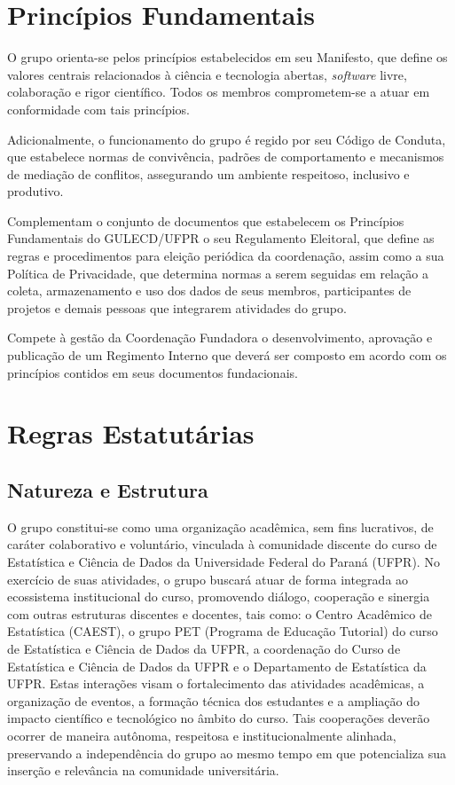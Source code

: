 \documentclass[
  12pt,          %
  a4paper,       %
  oneside,       %
  brazil         %
]{article}
\begin{document}
\section{Princípios Fundamentais}

O grupo orienta-se pelos princípios estabelecidos em seu Manifesto, que define os valores centrais relacionados à ciência e tecnologia abertas, \textit{software} livre, 
colaboração e rigor científico. Todos os membros comprometem-se a atuar em conformidade com tais princípios.

Adicionalmente, o funcionamento do grupo é regido por seu Código de Conduta, que estabelece normas de convivência, padrões de comportamento e 
mecanismos de mediação de conflitos, assegurando um ambiente respeitoso, inclusivo e produtivo.

Complementam o conjunto de documentos que estabelecem os Princípios Fundamentais do GULECD/UFPR o seu Regulamento Eleitoral, que define as regras e procedimentos para eleição 
periódica da coordenação, assim como a sua Política de Privacidade, que determina normas a serem seguidas em relação a coleta, armazenamento e uso dos dados de seus membros, 
participantes de projetos e demais pessoas que integrarem atividades do grupo.

Compete à gestão da Coordenação Fundadora o desenvolvimento, aprovação e publicação de um Regimento Interno que deverá ser composto em acordo com os princípios contidos 
em seus documentos fundacionais.

\section{Regras Estatutárias}

\subsection{Natureza e Estrutura}

O grupo constitui-se como uma organização acadêmica, sem fins lucrativos, de caráter colaborativo e voluntário, vinculada à comunidade 
discente do curso de Estatística e Ciência de Dados da Universidade Federal do Paraná (UFPR). 
No exercício de suas atividades, o grupo buscará atuar de forma integrada ao ecossistema institucional do curso, promovendo diálogo, 
cooperação e sinergia com outras estruturas discentes e docentes, tais como: o Centro Acadêmico de Estatística (CAEST), o grupo PET 
(Programa de Educação Tutorial) do curso de Estatística e Ciência de Dados da UFPR, 
a coordenação do Curso de Estatística e Ciência de Dados da UFPR e o Departamento de Estatística da UFPR. Estas interações visam o 
fortalecimento das atividades acadêmicas, a organização de eventos, a formação técnica dos estudantes 
e a ampliação do impacto científico e tecnológico no âmbito do curso. Tais cooperações deverão ocorrer de maneira autônoma, 
respeitosa e institucionalmente alinhada, preservando a independência do grupo ao mesmo tempo em que potencializa sua inserção 
e relevância na comunidade universitária.
\end{document}
